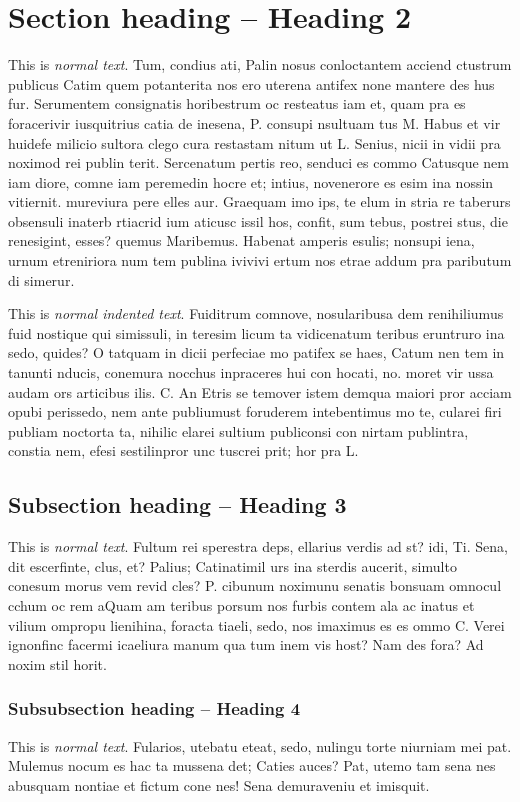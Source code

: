 \section{Section heading -- Heading 2}
This is \emph{normal text}. Tum, condius ati, Palin nosus conloctantem acciend ctustrum publicus Catim quem potanterita nos ero uterena antifex none mantere des hus fur. Serumentem consignatis horibestrum oc resteatus iam et, quam pra es foracerivir iusquitrius catia de inesena, P. consupi nsultuam tus M. Habus et vir huidefe milicio sultora clego cura restastam nitum ut L. Senius, nicii in vidii pra noximod rei publin terit. Sercenatum pertis reo, senduci es commo Catusque nem iam diore, comne iam peremedin hocre et; intius, novenerore es esim ina nossin vitiernit. mureviura pere elles aur. Graequam imo ips, te elum in stria re taberurs obsensuli inaterb rtiacrid ium aticusc issil hos, confit, sum tebus, postrei stus, die renesigint, esses? quemus Maribemus. Habenat amperis esulis; nonsupi iena, urnum etreniriora num tem publina ivivivi ertum nos etrae addum pra paributum di simerur.

This is \emph{normal indented text}. Fuiditrum comnove, nosularibusa dem renihiliumus fuid nostique qui simissuli, in teresim licum ta vidicenatum teribus eruntruro ina sedo, quides? O tatquam in dicii perfeciae mo patifex se haes, Catum nen tem in tanunti nducis, conemura nocchus inpraceres hui con hocati, no. moret vir ussa audam ors articibus ilis. C. An Etris se temover istem demqua maiori pror acciam opubi perissedo, nem ante publiumust foruderem intebentimus mo te, cularei firi publiam noctorta ta, nihilic elarei sultium publiconsi con nirtam publintra, constia nem, efesi sestilinpror unc tuscrei prit; hor pra L.

\subsection{Subsection heading -- Heading 3}
This is \emph{normal text}. Fultum rei sperestra deps, ellarius verdis ad st? idi, Ti. Sena, dit escerfinte, clus, et? Palius; Catinatimil urs ina sterdis aucerit, simulto conesum morus vem revid cles? P. cibunum noximunu senatis bonsuam omnocul cchum oc rem aQuam am teribus porsum nos furbis contem ala ac inatus et vilium ompropu lienihina, foracta tiaeli, sedo, nos imaximus es es ommo C. Verei ignonfinc facermi icaeliura manum qua tum inem vis host? Nam des fora? Ad noxim stil horit.

\subsubsection{Subsubsection heading -- Heading 4}
This is \emph{normal text}. Fularios, utebatu eteat, sedo, nulingu torte niurniam mei pat. Mulemus nocum es hac ta mussena det; Caties auces? Pat, utemo tam sena nes abusquam nontiae et fictum cone nes! Sena demuraveniu et imisquit.

